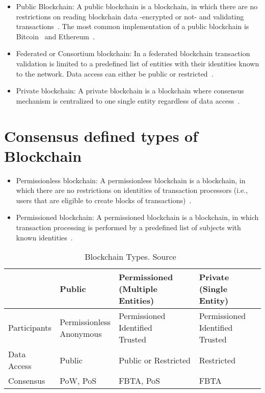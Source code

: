 \begin{itemize}
  \item Public Blockchain: A public blockchain is a blockchain, in which there are no restrictions on reading blockchain data -encrypted or not- and validating transactions~\cite{prbc_vs_pubbc}.
  The most common implementation of a public blockchain is Bitcoin~\cite{nakamoto2012bitcoin} and Ethereum~\cite{ethash}.
  \item Federated or Consortium blockchain: In a federated blockchain transaction validation is limited to a predefined list of entities with their identities known to the network. Data access can either be public or restricted~\cite{prbc_vs_pubbc}.
  \item Private blockchain: A private blockchain is a blockchain where consensus mechanism is centralized to one single entity regardless of data access~\cite{prbc_vs_pubbc}.
\end{itemize}

\section{Consensus defined types of Blockchain}\label{blockchain:consensus_blockchain_types}

\begin{itemize}
  \item Permissionless blockchain: A permissionless blockchain is a blockchain, in which there are no restrictions on identities of transaction processors (i.e., users that are eligible to create blocks of transactions)~\cite{prbc_vs_pubbc}.
  \item Permissioned blockchain: A permissioned blockchain is a blockchain, in which transaction processing is performed by a predefined list of subjects with known identities~\cite{prbc_vs_pubbc}.
\end{itemize}

\begin{table}[!ht]
  \centering
  \begin{tabular}{|l|l|l|l|}
    \hline
     & Public & \makecell[cl]{Permissioned \\ (Multiple Entities)} & \makecell[cl]{Private \\ (Single Entity)} \\ \hline
     Participants & \makecell[cl]{Permissionless \\ Anonymous} & \makecell[cl]{Permissioned \\ Identified \\ Trusted} & \makecell[cl]{Permissioned \\ Identified \\ Trusted} \\ \hline
     Data Access & Public & Public or Restricted & Restricted \\ \hline
     Consensus & PoW, PoS & FBTA, PoS & FBTA \\ \hline
  \end{tabular}
  \caption{Blockchain Types. Source~\cite{hub-bl-types}}
  \label{table:blockchain_types}
\end{table}

